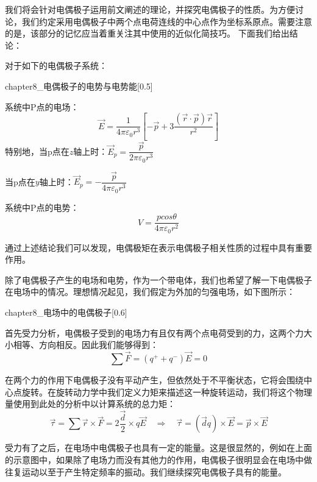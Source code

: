 我们将会针对电偶极子运用前文阐述的理论，并探究电偶极子的性质。为方便讨论，我们约定采用电偶极子中两个点电荷连线的中心点作为坐标系原点。需要注意的是，该部分的记忆应当着重关注其中使用的近似化简技巧。
下面我们给出结论：
\begin{law}
    对于如下的电偶极子系统：
    \begin{singlefigure}[电偶极子系统示意图]{chapter8_电偶极子的电势与电势能}[0.5]
    \end{singlefigure}
    \begin{Itemize}
        \item 系统中P点的电场：
            \[\vec{E} = \dfrac{1}{4\pi\varepsilon_0 r^3}[-\vec{p}+3\dfrac{(\vec{r}\cdot\vec{p})\vec{r}}{r^2}]\]
            特别地，当p点在$z$轴上时：$\vec{E}_p=\dfrac{\vec{p}}{2\pi\varepsilon_0 r^3}$\par
            \vspace{2mm}
            当p点在$y$轴上时：$\vec{E}_p=-\dfrac{\vec{p}}{4\pi\varepsilon_0 r^3}$
        \item 系统中P点的电势：
            \[V = \dfrac{pcos\theta}{4\pi\varepsilon_0 r^2}\]
    \end{Itemize}
\end{law}

通过上述结论我们可以发现，电偶极矩在表示电偶极子相关性质的过程中具有重要作用。

除了电偶极子产生的电场和电势，作为一个带电体，我们也希望了解一下电偶极子在电场中的情况。理想情况起见，我们假定为外加的匀强电场，如下图所示：
\begin{singlefigure}[电场中的电偶极子]{chapter8_电场中的电偶极子}[0.6]
\end{singlefigure}
首先受力分析，电偶极子受到的电场力有且仅有两个点电荷受到的力，这两个力大小相等、方向相反。因此我们能够得到：
\[\sum \vec{F}=(q^{+}+q^{-})\vec{E}=0\]

在两个力的作用下电偶极子没有平动产生，但依然处于不平衡状态，它将会围绕中心点旋转。在旋转动力学中我们定义力矩来描述这一种旋转运动，我们将这个物理量使用到此处的分析中以计算系统的总力矩：
\[\vec{\tau}=\sum \vec{r}\times\vec{F}=2\dfrac{\vec{d}}{2}\times q\vec{E}\quad\Rightarrow\quad\vec{\tau}=(\vec{d}q)\times\vec{E}=\vec{p}\times\vec{E}\]

受力有了之后，在电场中电偶极子也具有一定的能量。这是很显然的，例如在上面的示意图中，如果除了电场力而没有其他力的作用，电偶极子很明显会在电场中做往复运动以至于产生特定频率的振动。我们继续探究电偶极子具有的能量。


